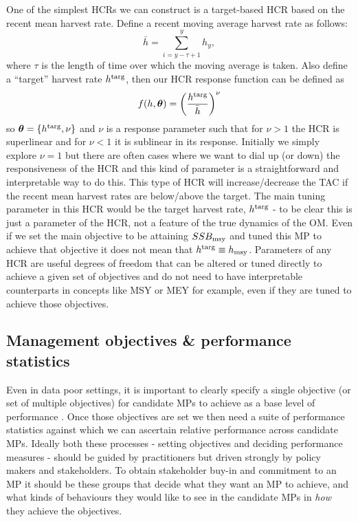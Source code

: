 \documentclass[12pt,a4paper,twoside,times,sky,standard]{csiroreport2017}
\newcommand{\ds}{\displaystyle}
\newcommand{\xtheta}{\mbox{\boldmath$\theta$}}
\begin{document}
One of the simplest HCRs we can construct is a target-based HCR based on the recent mean harvest rate. Define a recent moving average harvest rate as follows:
\begin{equation*}
    \ds \bar{h}=\sum\limits_{i=y-\tau+1}^y h_y,
\end{equation*}
where $\tau$ is the length of time over which the moving average is taken. Also define a ``target'' harvest rate $h^{\rm targ}$, then our HCR response function can be defined as
\begin{equation*}
    \ds f(h,\xtheta)=\left(\frac{h^{\rm targ}}{\bar{h}}\right)^\nu
\end{equation*}
so $\xtheta=\{h^{\rm targ},\nu\}$ and $\nu$ is a response parameter such that for $\nu>1$ the HCR is superlinear and for $\nu<1$ it is sublinear in its response. Initially we simply explore $\nu=1$ but there are often cases where we want to dial up (or down) the responsiveness of the HCR and this kind of parameter is a straightforward and interpretable way to do this. This type of HCR will increase/decrease the TAC if the recent mean harvest rates are below/above the target. The main tuning parameter in this HCR would be the target harvest rate, $h^{\rm targ}$ - to be clear this is just a parameter of the HCR, not a feature of the true dynamics of the OM. Even if we set the main objective to be attaining $SSB_{\rm msy}$ and tuned this MP to achieve that objective it does not mean that $h^{\rm targ}\equiv h_{\rm msy}$. Parameters of any HCR are useful degrees of freedom that can be altered or tuned directly to achieve a given set of objectives and do not need to have interpretable counterparts in concepts like MSY or MEY for example, even if they are tuned to achieve those objectives. 

\subsection{Management objectives \& performance statistics}

Even in data poor settings, it is important to clearly specify a single objective (or set of multiple objectives) for candidate MPs to achieve as a base level of performance \cite{mse}. Once those objectives are set we then need a suite of performance statistics against which we can ascertain relative performance across candidate MPs. Ideally both these processes - setting objectives and deciding performance measures - should be guided by practitioners but driven strongly by policy makers and stakeholders. To obtain stakeholder buy-in and commitment to an MP it should be these groups that decide what they want an MP to achieve, and what kinds of behaviours they would like to see in the candidate MPs in \emph{how} they achieve the objectives. 
\end{document}
